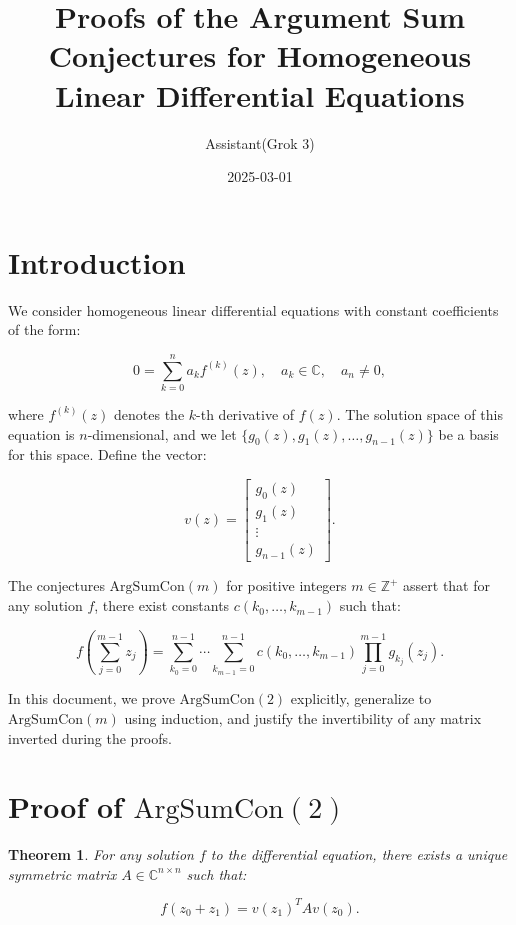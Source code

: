 \documentclass{article}
\title{Proofs of the Argument Sum Conjectures for Homogeneous Linear Differential Equations}
\author{Assistant(Grok 3)}
\date{2025-03-01}
\newtheorem{theorem}{Theorem}
\begin{document}
	
	\maketitle
	
	\section{Introduction}
	
	We consider homogeneous linear differential equations with constant coefficients of the form:
	
	\begin{equation}
		0 = \sum_{k=0}^n a_k f^{(k)}(z), \quad a_k \in \mathbb{C}, \quad a_n \neq 0,
	\end{equation}
	
	where \(f^{(k)}(z)\) denotes the \(k\)-th derivative of \(f(z)\). The solution space of this equation is \(n\)-dimensional, and we let \(\{g_0(z), g_1(z), \ldots, g_{n-1}(z)\}\) be a basis for this space. Define the vector:
	
	\begin{equation}
		v(z) = \begin{bmatrix} g_0(z) \\ g_1(z) \\ \vdots \\ g_{n-1}(z) \end{bmatrix}.
	\end{equation}
	
	The conjectures \(\text{ArgSumCon}(m)\) for positive integers \(m \in \mathbb{Z}^+\) assert that for any solution \(f\), there exist constants \(c(k_0, \ldots, k_{m-1})\) such that:
	
	\begin{equation}
		f\left( \sum_{j=0}^{m-1} z_j \right) = \sum_{k_0=0}^{n-1} \cdots \sum_{k_{m-1}=0}^{n-1} c(k_0, \ldots, k_{m-1}) \prod_{j=0}^{m-1} g_{k_j}(z_j).
	\end{equation}
	
	In this document, we prove \(\text{ArgSumCon}(2)\) explicitly, generalize to \(\text{ArgSumCon}(m)\) using induction, and justify the invertibility of any matrix inverted during the proofs.
	
	\section{Proof of \(\text{ArgSumCon}(2)\)}
	
	\begin{theorem}
		For any solution \(f\) to the differential equation, there exists a unique symmetric matrix \(A \in \mathbb{C}^{n \times n}\) such that:
		
		\begin{equation}
			f(z_0 + z_1) = v(z_1)^T A v(z_0).
		\end{equation}
	\end{theorem}
	
\end{document}
